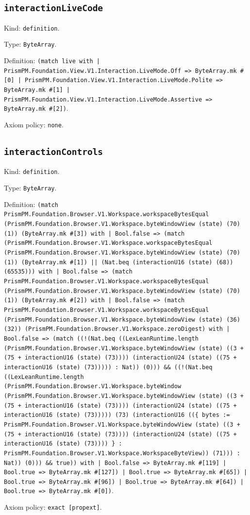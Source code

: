 \documentclass[11pt]{article}
\begin{document}
\subsection*{\texttt{interactionLiveCode}}
\noindent Kind: \texttt{definition}.\par
\noindent Type: \texttt{ByteArray}.\par
\noindent Definition: \texttt{(match live with | PrismPM.Foundation.View.V1.Interaction.LiveMode.Off => ByteArray.mk \#[0] | PrismPM.Foundation.View.V1.Interaction.LiveMode.Polite => ByteArray.mk \#[1] | PrismPM.Foundation.View.V1.Interaction.LiveMode.Assertive => ByteArray.mk \#[2])}.\par
\noindent Axiom policy: \texttt{none}.\par
\subsection*{\texttt{interactionControls}}
\noindent Kind: \texttt{definition}.\par
\noindent Type: \texttt{ByteArray}.\par
\noindent Definition: \texttt{(match PrismPM.Foundation.Browser.V1.Workspace.workspaceBytesEqual (PrismPM.Foundation.Browser.V1.Workspace.byteWindowView (state) (70) (1)) (ByteArray.mk \#[3]) with | Bool.false => (match (PrismPM.Foundation.Browser.V1.Workspace.workspaceBytesEqual (PrismPM.Foundation.Browser.V1.Workspace.byteWindowView (state) (70) (1)) (ByteArray.mk \#[1]) || (Nat.beq (interactionU16 (state) (68)) (65535))) with | Bool.false => (match PrismPM.Foundation.Browser.V1.Workspace.workspaceBytesEqual (PrismPM.Foundation.Browser.V1.Workspace.byteWindowView (state) (70) (1)) (ByteArray.mk \#[2]) with | Bool.false => (match PrismPM.Foundation.Browser.V1.Workspace.workspaceBytesEqual (PrismPM.Foundation.Browser.V1.Workspace.byteWindowView (state) (36) (32)) (PrismPM.Foundation.Browser.V1.Workspace.zeroDigest) with | Bool.false => (match ((!(Nat.beq ((LexLeanRuntime.length (PrismPM.Foundation.Browser.V1.Workspace.byteWindowView (state) ((3 + (75 + interactionU16 (state) (73)))) (interactionU24 (state) ((75 + interactionU16 (state) (73))))) : Nat)) (0))) \&\& ((!(Nat.beq ((LexLeanRuntime.length (PrismPM.Foundation.Browser.V1.Workspace.byteWindow (PrismPM.Foundation.Browser.V1.Workspace.byteWindowView (state) ((3 + (75 + interactionU16 (state) (73)))) (interactionU24 (state) ((75 + interactionU16 (state) (73))))) (73) (interactionU16 ((\{ bytes := PrismPM.Foundation.Browser.V1.Workspace.byteWindowView (state) ((3 + (75 + interactionU16 (state) (73)))) (interactionU24 (state) ((75 + interactionU16 (state) (73)))) \} : PrismPM.Foundation.Browser.V1.Workspace.WorkspaceByteView)) (71))) : Nat)) (0))) \&\& true)) with | Bool.false => ByteArray.mk \#[119] | Bool.true => ByteArray.mk \#[127]) | Bool.true => ByteArray.mk \#[65]) | Bool.true => ByteArray.mk \#[96]) | Bool.true => ByteArray.mk \#[64]) | Bool.true => ByteArray.mk \#[0])}.\par
\noindent Axiom policy: \texttt{exact [propext]}.\par
\end{document}
